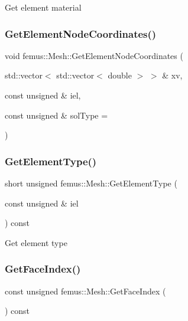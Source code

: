 Get element material \mbox{\label{classfemus_1_1_mesh_a5ecff0973c93b7acc768939d22827627}} 
\subsubsection{\texorpdfstring{Get\+Element\+Node\+Coordinates()}{GetElementNodeCoordinates()}}
{\footnotesize\ttfamily void femus\+::\+Mesh\+::\+Get\+Element\+Node\+Coordinates (\begin{DoxyParamCaption}\item[{std\+::vector$<$ std\+::vector$<$ double $>$ $>$ \&}]{xv,  }\item[{const unsigned \&}]{iel,  }\item[{const unsigned \&}]{sol\+Type = {} }\end{DoxyParamCaption})}

\mbox{\label{classfemus_1_1_mesh_af92bd9944b1d887562b460ede06acf44}} 
\subsubsection{\texorpdfstring{Get\+Element\+Type()}{GetElementType()}}
{\footnotesize\ttfamily short unsigned femus\+::\+Mesh\+::\+Get\+Element\+Type (\begin{DoxyParamCaption}\item[{const unsigned \&}]{iel }\end{DoxyParamCaption}) const}

Get element type \mbox{\label{classfemus_1_1_mesh_acc7eefc6288f04c47598abd8ea08471c}} 
\subsubsection{\texorpdfstring{Get\+Face\+Index()}{GetFaceIndex()}}
{\footnotesize\ttfamily const unsigned femus\+::\+Mesh\+::\+Get\+Face\+Index (\begin{DoxyParamCaption}{ }\end{DoxyParamCaption}) const\hspace{0.3cm}{\ttfamily [inline]}}

